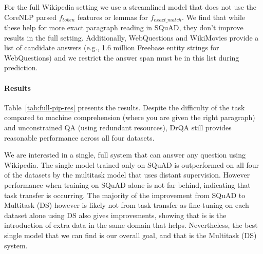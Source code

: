 \documentclass[11pt,a4paper]{article}
\newcommand\wq{WebQuestions\xspace}
\newcommand\us{DrQA\xspace}
\begin{document}
For the full Wikipedia setting we use a streamlined model that does not use the CoreNLP parsed $f_{token}$ features or lemmas for $f_{exact\_match}$. We find that while these help for more exact paragraph reading in SQuAD, they don't improve results in the full setting. Additionally, WebQuestions and WikiMovies provide a list of candidate answers (e.g., 1.6 million Freebase entity strings for WebQuestions) and we restrict the answer span must be in this list during prediction.

\paragraph{Results}
Table~\ref{tab:full-pip-res} presents the results.
Despite the difficulty of the task compared to machine comprehension (where you are given the right paragraph) and unconstrained QA (using redundant resources), \us still provides reasonable performance across all four datasets.

We are interested in a single, full system that can answer any question using Wikipedia. The single model trained only on SQuAD is outperformed on all four of the datasets by the multitask model that uses distant supervision.
However performance when training on SQuAD alone is not far behind, indicating that task transfer is occurring.
The majority of the improvement from SQuAD to Multitask (DS) however is likely not from task transfer as fine-tuning on each dataset alone using DS also gives improvements, showing that is is the introduction of extra data in the same domain that helps. Nevertheless, the best single model that we can find is our overall goal, and that is the Multitask (DS) system.


%
\end{document}
